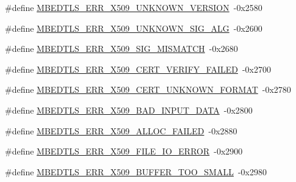 \begin{DoxyCompactItemize}
\item 
\#define \mbox{\hyperlink{group__x509__module_gab80a4eb806328731def21ec2ebcbc365}{M\+B\+E\+D\+T\+L\+S\+\_\+\+E\+R\+R\+\_\+\+X509\+\_\+\+U\+N\+K\+N\+O\+W\+N\+\_\+\+V\+E\+R\+S\+I\+ON}}~-\/0x2580
\item 
\#define \mbox{\hyperlink{group__x509__module_ga488f8616b42eae6fe3fb9815d43c976f}{M\+B\+E\+D\+T\+L\+S\+\_\+\+E\+R\+R\+\_\+\+X509\+\_\+\+U\+N\+K\+N\+O\+W\+N\+\_\+\+S\+I\+G\+\_\+\+A\+LG}}~-\/0x2600
\item 
\#define \mbox{\hyperlink{group__x509__module_gac489ce5e8ba417bcd86012ebbb7f5044}{M\+B\+E\+D\+T\+L\+S\+\_\+\+E\+R\+R\+\_\+\+X509\+\_\+\+S\+I\+G\+\_\+\+M\+I\+S\+M\+A\+T\+CH}}~-\/0x2680
\item 
\#define \mbox{\hyperlink{group__x509__module_gaba46df0041dcf48fa9d164d28cf3a154}{M\+B\+E\+D\+T\+L\+S\+\_\+\+E\+R\+R\+\_\+\+X509\+\_\+\+C\+E\+R\+T\+\_\+\+V\+E\+R\+I\+F\+Y\+\_\+\+F\+A\+I\+L\+ED}}~-\/0x2700
\item 
\#define \mbox{\hyperlink{group__x509__module_gaeb90af9ad906c5075b1ad625ebc26553}{M\+B\+E\+D\+T\+L\+S\+\_\+\+E\+R\+R\+\_\+\+X509\+\_\+\+C\+E\+R\+T\+\_\+\+U\+N\+K\+N\+O\+W\+N\+\_\+\+F\+O\+R\+M\+AT}}~-\/0x2780
\item 
\#define \mbox{\hyperlink{group__x509__module_gaeeef11ebf0b31a54a665b1a3fd65c3f7}{M\+B\+E\+D\+T\+L\+S\+\_\+\+E\+R\+R\+\_\+\+X509\+\_\+\+B\+A\+D\+\_\+\+I\+N\+P\+U\+T\+\_\+\+D\+A\+TA}}~-\/0x2800
\item 
\#define \mbox{\hyperlink{group__x509__module_gacf6d98c6cbb76728260d1dcb1fe3bc7d}{M\+B\+E\+D\+T\+L\+S\+\_\+\+E\+R\+R\+\_\+\+X509\+\_\+\+A\+L\+L\+O\+C\+\_\+\+F\+A\+I\+L\+ED}}~-\/0x2880
\item 
\#define \mbox{\hyperlink{group__x509__module_gad85d9c7aa5c30b9730297bef3386407c}{M\+B\+E\+D\+T\+L\+S\+\_\+\+E\+R\+R\+\_\+\+X509\+\_\+\+F\+I\+L\+E\+\_\+\+I\+O\+\_\+\+E\+R\+R\+OR}}~-\/0x2900
\item 
\#define \mbox{\hyperlink{group__x509__module_gab9516fc53ff90c547fd77d35c71feec7}{M\+B\+E\+D\+T\+L\+S\+\_\+\+E\+R\+R\+\_\+\+X509\+\_\+\+B\+U\+F\+F\+E\+R\+\_\+\+T\+O\+O\+\_\+\+S\+M\+A\+LL}}~-\/0x2980
\end{DoxyCompactItemize}
